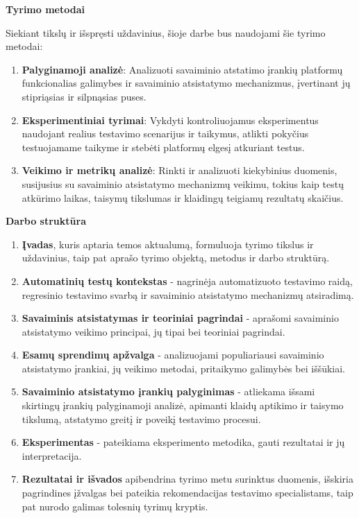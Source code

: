 \documentclass[
]{VUMIFPSkursinis}
\begin{document}
\textbf{Tyrimo metodai}

Siekiant tikslų ir išspręsti uždavinius, šioje darbe bus naudojami šie tyrimo metodai:

\begin{enumerate}
    \item \textbf{Palyginamoji analizė}: Analizuoti savaiminio atstatimo įrankių platformų funkcionalias galimybes ir savaiminio atsistatymo mechanizmus, įvertinant jų stipriąsias ir silpnąsias puses.
    \item \textbf{Eksperimentiniai tyrimai}: Vykdyti kontroliuojamus eksperimentus naudojant realius testavimo scenarijus ir taikymus, atlikti pokyčius testuojamame taikyme ir stebėti platformų elgesį atkuriant testus.
    \item \textbf{Veikimo ir metrikų analizė}: Rinkti ir analizuoti kiekybinius duomenis, susijusius su savaiminio atsistatymo mechanizmų veikimu, tokius kaip testų atkūrimo laikas, taisymų tikslumas ir klaidingų teigiamų rezultatų skaičius.
\end{enumerate}

\textbf{Darbo struktūra}
\begin{enumerate}
    \item \textbf{Įvadas}, kuris aptaria temos aktualumą, formuluoja tyrimo tikslus ir uždavinius, taip pat aprašo tyrimo objektą, metodus ir darbo struktūrą.
    \item \textbf{Automatinių testų kontekstas} - nagrinėja automatizuoto testavimo raidą, regresinio testavimo svarbą ir savaiminio atsistatymo mechanizmų atsiradimą.
    \item \textbf{Savaiminis atsistatymas ir teoriniai pagrindai} - aprašomi savaiminio atsistatymo veikimo principai, jų tipai bei teoriniai pagrindai.
    \item \textbf{Esamų sprendimų apžvalga} - analizuojami populiariausi savaiminio atsistatymo įrankiai, jų veikimo metodai, pritaikymo galimybės bei iššūkiai.
    \item \textbf{Savaiminio atsistatymo įrankių palyginimas} - atliekama išsami skirtingų įrankių palyginamoji analizė, apimanti klaidų aptikimo ir taisymo tikslumą, atstatymo greitį ir poveikį testavimo procesui.
    \item \textbf{Eksperimentas} - pateikiama eksperimento metodika, gauti rezultatai ir jų interpretacija.
    \item \textbf{Rezultatai ir išvados} apibendrina tyrimo metu surinktus duomenis, išskiria pagrindines įžvalgas bei pateikia rekomendacijas testavimo specialistams, taip pat nurodo galimas tolesnių tyrimų kryptis.
\end{enumerate}
\end{document}
